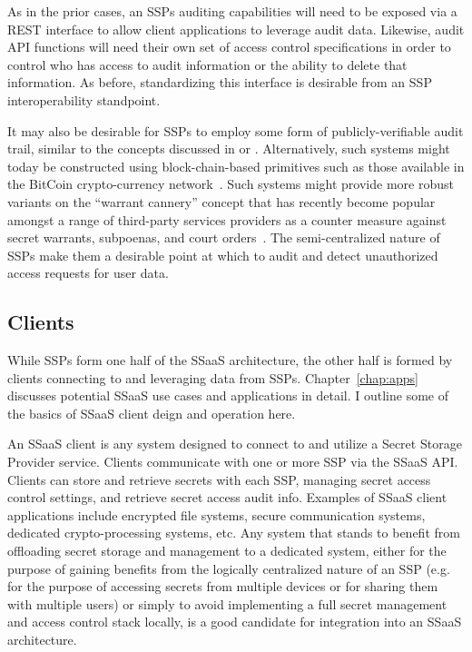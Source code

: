 As in the prior cases, an SSPs auditing capabilities will need to be
exposed via a REST interface to allow client applications to leverage
audit data. Likewise, audit API functions will need their own set of
access control specifications in order to control who has access to
audit information or the ability to delete that information. As
before, standardizing this interface is desirable from an SSP
interoperability standpoint.

It may also be desirable for SSPs to employ some form of
publicly-verifiable audit trail, similar to the concepts discussed in
\cite{blaze1996} or \cite{laurie2013}. Alternatively, such systems
might today be constructed using block-chain-based primitives such as
those available in the BitCoin crypto-currency
network~\cite{Nakamoto2008}. Such systems might provide more robust
variants on the ``warrant cannery'' concept that has recently become
popular amongst a range of third-party services providers as a counter
measure against secret warrants, subpoenas, and court
orders~\cite{eff-canary}. The semi-centralized nature of SSPs make
them a desirable point at which to audit and detect unauthorized
access requests for user data.

\subsection{Clients}

While SSPs form one half of the SSaaS architecture, the other half is
formed by clients connecting to and leveraging data from
SSPs. Chapter~\ref{chap:apps} discusses potential SSaaS use cases and
applications in detail. I outline some of the basics of SSaaS client
deign and operation here.

An SSaaS client is any system designed to connect to and utilize a
Secret Storage Provider service. Clients communicate with one or more
SSP via the SSaaS API. Clients can store and retrieve secrets with
each SSP, managing secret access control settings, and retrieve secret
access audit info. Examples of SSaaS client applications include
encrypted file systems, secure communication systems, dedicated
crypto-processing systems, etc. Any system that stands to benefit from
offloading secret storage and management to a dedicated system, either
for the purpose of gaining benefits from the logically centralized
nature of an SSP (e.g. for the purpose of accessing secrets from
multiple devices or for sharing them with multiple users) or simply to
avoid implementing a full secret management and access control stack
locally, is a good candidate for integration into an SSaaS
architecture.

